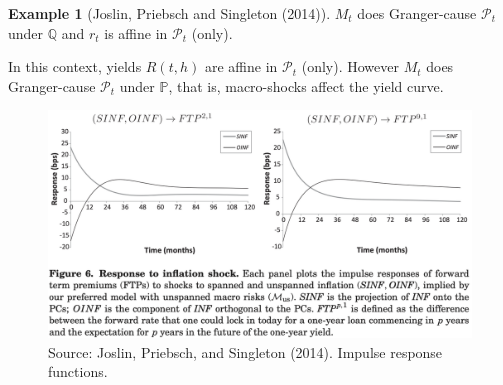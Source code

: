 \documentclass[
  12pt,
]{book}
\theoremstyle{definition}
\theoremstyle{definition}
\newtheorem{example}{Example}[chapter]
\theoremstyle{definition}
\theoremstyle{definition}
\theoremstyle{remark}
\begin{document}
\begin{example}[Joslin, Priebsch and Singleton (2014)]
\(M_t\) does Granger-cause \(\mathcal{P}_t\) under \(\mathbb{Q}\) and \(r_t\) is affine in \(\mathcal{P}_t\) (only).

In this context, yields \(R(t,h)\) are affine in \(\mathcal{P}_t\) (only). However \(M_t\) does Granger-cause \(\mathcal{P}_t\) under \(\mathbb{P}\), that is, macro-shocks affect the yield curve.

\begin{figure}

{\centering \includegraphics[width=0.95\linewidth]{figures/JPS_IRF} 

}

\caption{Source: Joslin, Priebsch, and Singleton (2014). Impulse response functions.}\label{fig:JPSIRF}
\end{figure}

\end{example}
\end{document}
